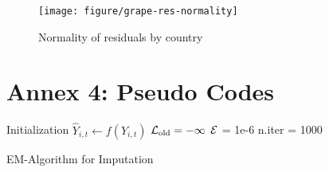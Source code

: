 \documentclass[nojss]{jss}\usepackage[]{graphicx}\usepackage[]{color}
\makeatletter
\def\maxwidth{ %
  \ifdim\Gin@nat@width>\linewidth
    \linewidth
  \else
    \Gin@nat@width
  \fi
}
\newenvironment{knitrout}{}{} %
\makeatother
\begin{document}
\begin{knitrout}
\color{fgcolor}\begin{figure}[!ht]


{\centering \texttt{[image: figure/grape-res-normality]} 

}

\caption[Normality of residuals by country]{Normality of residuals by country\label{fig:grape-res-normality}}
\end{figure}


\end{knitrout}


\FloatBarrier
\section*{Annex 4: Pseudo Codes}

\begin{algorithm}
  \SetAlgoLined
  \BlankLine
  Initialization\;
  \Indp\Indp\Indp 
  $\hat{Y}_{i, t} \leftarrow f(Y_{i, t})$\;
  $\cal{L}_{\text{old}} = -\infty$\;
  $\cal{E}$ = 1e-6\;
  n.iter = 1000\;
  \Indm\Indm\Indm

  
    
    
    \caption{EM-Algorithm for Imputation}
    \label{alg:imputation}
\end{algorithm}
  
      
\end{document}
